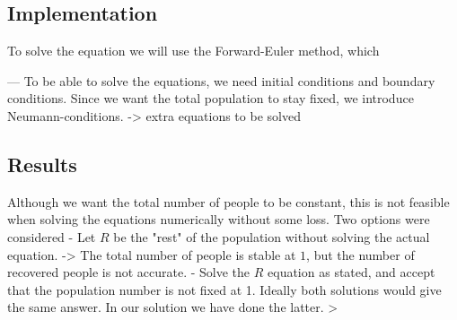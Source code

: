 \subsection{Implementation}
To solve the equation we will use the Forward-Euler method, which 

---
To be able to solve the equations, we need initial conditions and boundary conditions. Since we want the total population to stay fixed, we introduce Neumann-conditions.
-> extra equations to be solved

\subsection{Results}
Although we want the total number of people to be constant, this is not feasible when solving the equations numerically without some loss. Two options were considered
- Let $R$ be the "rest" of the population without solving the actual equation. -> The total number of people is stable at $1$, but the number of recovered people is not accurate.
- Solve the $R$ equation as stated, and accept that the population number is not fixed at 1.
Ideally both solutions would give the same answer.
In our solution we have done the latter. >
